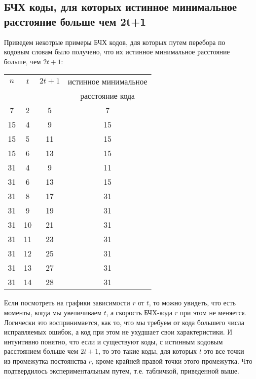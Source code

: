 \documentclass[12pt]{article}
\begin{document}
        \subsection{БЧХ коды, для которых истинное минимальное расстояние больше чем 2t+1}
            Приведем некотрые примеры БЧХ кодов, для которых путем перебора по кодовым словам было получено, что их истинное минимальное расстояние больше, чем $2t + 1$:
            \begin{center}
                \begin{tabular}{|c|c|c|c|}
                    \hline
                    $n$ & $t$ & $2t + 1$ & истинное минимальное \\
                    & & & расстояние кода \\
                    \hline
                    7 & 2 & 5 & 7 \\
                    \hline
                    15 & 4 & 9 & 15 \\
                    \hline
                    15 & 5 & 11 & 15 \\
                    \hline
                    15 & 6 & 13 & 15 \\
                    \hline
                    31 & 4 & 9 & 11 \\
                    \hline
                    31 & 6 & 13 & 15 \\
                    \hline
                    31 & 8 & 17 & 31 \\
                    \hline
                    31 & 9 & 19 & 31 \\
                    \hline
                    31 & 10 & 21 & 31 \\
                    \hline
                    31 & 11 & 23 & 31 \\
                    \hline
                    31 & 12 & 25 & 31 \\
                    \hline
                    31 & 13 & 27 & 31 \\
                    \hline
                    31 & 14 & 28 & 31 \\
                    \hline
                \end{tabular}
            \end{center}
            Если посмотреть на графики зависимости $r$ от $t$, то можно увидеть, что есть моменты, когда мы увеличиваем $t$, а скорость БЧХ-кода $r$ при этом не меняется. Логически это воспринимается, как то, что мы требуем от кода большего числа исправляемых ошибок, а код при этом не ухудшает свои характеристики. И интуитивно понятно, что если и существуют коды, с истинным кодовым расстоянием больше чем $2t + 1$, то это такие коды, для которых $t$ это все точки из промежутка постоянства $r$, кроме крайней правой точки этого промежутка. Что подтвердилось экспериментальным путем, т.е. табличкой, приведенной выше.
\end{document}
